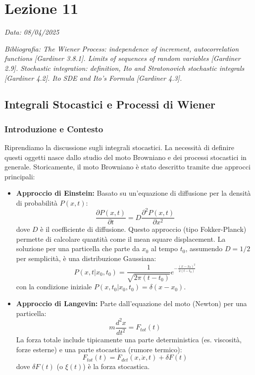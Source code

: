 \chapter{Lezione 11}
\label{chap:lezione_11} %

\begin{flushright}
\textit{Data: 08/04/2025}
\end{flushright}
\textit{Bibliografia: 
The Wiener Process: independence of increment, autocorrelation functions [Gardiner 3.8.1]. Limits of sequences of random variables [Gardiner 2.9]. Stochastic integration: definition, Ito and Stratonovich stochastic integrals [Gardiner 4.2]. Ito SDE and Ito's Formula [Gardiner 4.3].}

\section{Integrali Stocastici e Processi di Wiener}

\subsection{Introduzione e Contesto}
Riprendiamo la discussione sugli integrali stocastici. La necessità di definire questi oggetti nasce dallo studio del moto Browniano e dei processi stocastici in generale.
Storicamente, il moto Browniano è stato descritto tramite due approcci principali:

\begin{itemize}
    \item \textbf{Approccio di Einstein:}
    Basato su un'equazione di diffusione per la densità di probabilità $P(x,t)$:
    \begin{equation}
    \frac{\partial P(x,t)}{\partial t} = D \frac{\partial^2 P(x,t)}{\partial x^2}
    \end{equation}
    dove $D$ è il coefficiente di diffusione. Questo approccio (tipo Fokker-Planck) permette di calcolare quantità come il mean square displacement. La soluzione per una particella che parte da $x_0$ al tempo $t_0$, assumendo $D=1/2$ per semplicità, è una distribuzione Gaussiana:
    \begin{equation}
    P(x,t|x_0, t_0) = \frac{1}{\sqrt{2\pi(t-t_0)}} e^{-\frac{(x-x_0)^2}{2(t-t_0)}}
    \end{equation}
    con la condizione iniziale $P(x,t_0|x_0,t_0) = \delta(x-x_0)$.

    \item \textbf{Approccio di Langevin:}
    Parte dall'equazione del moto (Newton) per una particella:
    \begin{equation}
    m \frac{d^2x}{dt^2} = F_{tot}(t)
    \end{equation}
    La forza totale include tipicamente una parte deterministica (es. viscosità, forze esterne) e una parte stocastica (rumore termico):
    \begin{equation}
    F_{tot}(t) = F_{det}(x, \dot{x}, t) + \delta F(t)
    \end{equation}
    dove $\delta F(t)$ (o $\xi(t)$) è la forza stocastica.
\end{itemize}

